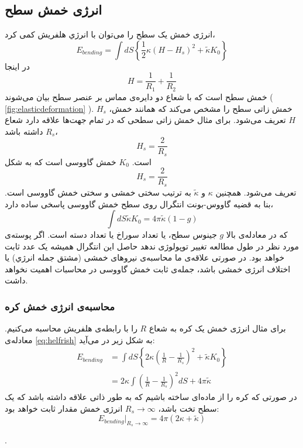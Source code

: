 \setRL


\subsection{
انرژی خمش سطح
}
انرژی خمش یک سطح را می‌توان با انرژي هلفریش
\cite{Helfrich1973}
 کمی کرد،
\begin{equation}
E_{bending}=\int dS\left\{\frac{1}{2}\kappa (H-H_s)^2 +\tilde \kappa K_0\right\}
\label{eq:helfrish}
\end{equation}
در اینجا
\begin{equation}
H = \frac{1}{R_1}+\frac{1}{R_2}
\end{equation}
خمش سطح است که با شعاع دو دایره‌ی مماس بر عنصر سطح بیان می‌شوند (
\ref{fig:elasticdeformation}
). 
$H_s$
خمش زاتی سطح را مشخص می‌کند که همانند خمش،
$H$
تعریف می‌شود. برای مثال خمش زاتی سطحی که در تمام جهت‌ها علاقه دارد شعاع 
$R_s$
داشته باشد، 
\begin{equation}
H_s = \frac{2}{R_s}
\end{equation}
است. 
$K_0$
خمش گاووسی است که به شکل 
\begin{equation}
H_s = \frac{2}{R_s}
\end{equation}
تعریف می‌شود. همچنین 
$\kappa$
و
$\tilde\kappa$
به ترتیب سختی خمشی و سختی خمش گاووسی است. بنا به قضیه گاووس-بونت
انتگرال روی سطح خمش گاووسی پاسخی ساده دارد،
\begin{equation}
\int dS \tilde \kappa K_0=4\pi\tilde\kappa(1-g)
\end{equation}
که در معادله‌ی بالا 
$g$
جینوس 
سطح، یا تعداد سوراخ یا تعداد دسته‌
است. اگر پوسته‌ی مورد نظر در طول مطالعه تغییر توپولوژی ندهد حاصل این انتگرال همیشه ‌یک عدد ثابت خواهد بود. در صورتی علاقه‌ی ما محاسبه‌ی نیرو‌های خمشی (مشتق جمله انرژي) یا اختلاف انرژی خمشی باشد، جمله‌ی ثابت خمش گاووسی در محاسبات اهمیت نخواهد داشت.
\subsubsection{
محاسبه‌ی انرژی خمش کره
}
برای مثال انرژی خمش یک کره به شعاع 
$R$
را با رابطه‌ی هلفریش محاسبه می‌کنیم. معادله‌ی 
\ref{eq:helfrish}
به شکل زیر در می‌آید:
\begin{equation}
\begin{aligned}
E_{bending}&=\int dS\left\{2\kappa \left(\frac{1}{R}-\frac{1}{R_s}\right)^2 +\tilde \kappa K_0\right\} \\
&=2\kappa\int \left(\frac{1}{R}-\frac{1}{R_s}\right)^2dS +4\pi\tilde \kappa
\end{aligned}
\end{equation}
در صورتی که کره را از ماده‌ای ساخته باشیم که به طور ذاتی علاقه داشته باشد که یک سطح تخت باشد،‌
$R_s\rightarrow\infty$
انرژی خمش مقدار ثابت خواهد بود:
\begin{equation}
E_{bending}|_{R_s\rightarrow\infty}=4\pi(2\kappa+\tilde\kappa)
\end{equation} 


.
 
 
 
 
 
 
 
 
 
 
 
 
 
 
 